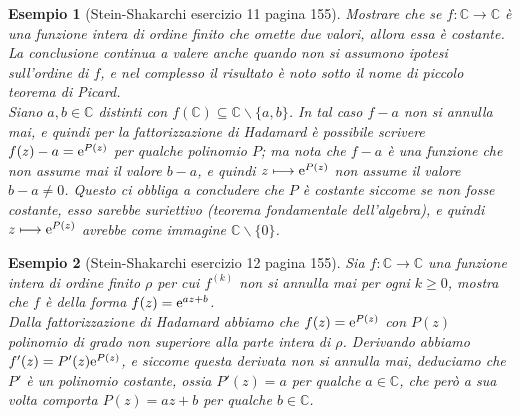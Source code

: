 \documentclass[11pt]{book}
\theoremstyle{Definizione}
\theoremstyle{TeoremaProposizioneLemmaCorollarioCongettura}
\theoremstyle{OsservazioneNotaEsempio}
\newtheorem{myes}{Esempio}[section]
\newcommand{\C}{\mathbb{C}}
\newcommand{\tolto}{\smallsetminus}
\newcommand{\e}{\textup{e}}
\begin{document}
\begin{myes}[Stein-Shakarchi esercizio 11 pagina 155]\label{es:SteinShakarchiEs11pag155}
Mostrare che se $f: \C\longrightarrow \C$ è una funzione intera di ordine finito che omette due valori, allora essa è costante. La conclusione continua a valere anche quando non si assumono ipotesi sull'ordine di $f$, e nel complesso il risultato è noto sotto il nome di piccolo teorema di Picard.\\
Siano $a,b\in \C$ distinti con $f(\C)\subseteq \C\tolto \{a,b\}$. In tal caso $f-a$ non si annulla mai, e quindi per la fattorizzazione di Hadamard è possibile scrivere $f(z)-a= \e^{P(z)}$ per qualche polinomio $P$; ma nota che $f-a$ è una funzione che non assume mai il valore $b-a$, e quindi $z \longmapsto \e^{P(z)}$ non assume il valore $b-a\neq 0$. Questo ci obbliga a concludere che $P$ è costante siccome se non fosse costante, esso sarebbe suriettivo (teorema fondamentale dell'algebra), e quindi $z\longmapsto \e^{P(z)}$ avrebbe come immagine $\C\tolto \{0\}$.
\end{myes}
\begin{myes}[Stein-Shakarchi esercizio 12 pagina 155]\label{es:SteinShakarchiEs12pag155}
Sia $f:\C\longrightarrow \C$ una funzione intera di ordine finito $\rho$ per cui $f^{(k)}$ non si annulla mai per ogni $k \geq 0$, mostra che $f$ è della forma $f(z) = \e^{az+b}$.\\
Dalla fattorizzazione di Hadamard abbiamo che $f(z) = \e^{P(z)}$ con $P(z)$ polinomio di grado non superiore alla parte intera di $\rho$. Derivando abbiamo $f'(z) = P'(z) \e^{P(z)}$, e siccome questa derivata non si annulla mai, deduciamo che $P'$ è un polinomio costante, ossia $P'(z) = a$ per qualche $a\in \C$, che però a sua volta comporta $P(z) = az+b$ per qualche $b\in \C$.
\end{myes}
\end{document}
